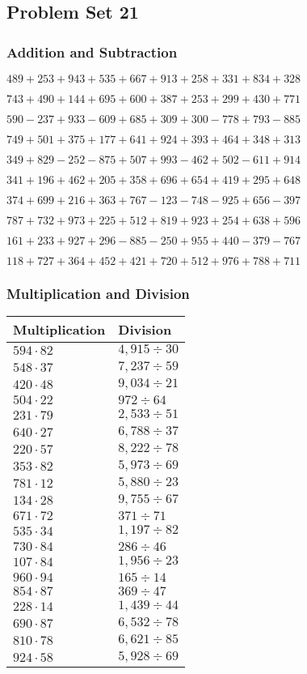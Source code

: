 \hypertarget{problem-set-21-2}{%
\subsection{Problem Set 21}\label{problem-set-21-2}}

\hypertarget{addition-and-subtraction-121}{%
\subsubsection{Addition and
Subtraction}\label{addition-and-subtraction-121}}

\(489 + 253 + 943 + 535 + 667 + 913 + 258 + 331 + 834 + 328\)

\(743 + 490 + 144 + 695 + 600 + 387 + 253 + 299 + 430 + 771\)

\(590 - 237 + 933 - 609 + 685 + 309 + 300 - 778 + 793 - 885\)

\(749 + 501 + 375 + 177 + 641 + 924 + 393 + 464 + 348 + 313\)

\(349 + 829 - 252 - 875 + 507 + 993 - 462 + 502 - 611 + 914\)

\(341 + 196 + 462 + 205 + 358 + 696 + 654 + 419 + 295 + 648\)

\(374 + 699 + 216 + 363 + 767 - 123 - 748 - 925 + 656 - 397\)

\(787 + 732 + 973 + 225 + 512 + 819 + 923 + 254 + 638 + 596\)

\(161 + 233 + 927 + 296 - 885 - 250 + 955 + 440 - 379 - 767\)

\(118 + 727 + 364 + 452 + 421 + 720 + 512 + 976 + 788 + 711\)

\hypertarget{multiplication-and-division-121}{%
\subsubsection{Multiplication and
Division}\label{multiplication-and-division-121}}

\begin{longtable}[]{@{}ll@{}}
\toprule
Multiplication & Division\tabularnewline
\midrule
\endhead
\(594 \cdot 82\) & \(4,915÷30\)\tabularnewline
\(548 \cdot 37\) & \(7,237÷59\)\tabularnewline
\(420 \cdot 48\) & \(9,034÷21\)\tabularnewline
\(504 \cdot 22\) & \(972÷64\)\tabularnewline
\(231 \cdot 79\) & \(2,533÷51\)\tabularnewline
\(640 \cdot 27\) & \(6,788÷37\)\tabularnewline
\(220 \cdot 57\) & \(8,222÷78\)\tabularnewline
\(353 \cdot 82\) & \(5,973÷69\)\tabularnewline
\(781 \cdot 12\) & \(5,880÷23\)\tabularnewline
\(134 \cdot 28\) & \(9,755÷67\)\tabularnewline
\(671 \cdot 72\) & \(371÷71\)\tabularnewline
\(535 \cdot 34\) & \(1,197÷82\)\tabularnewline
\(730 \cdot 84\) & \(286÷46\)\tabularnewline
\(107 \cdot 84\) & \(1,956÷23\)\tabularnewline
\(960 \cdot 94\) & \(165÷14\)\tabularnewline
\(854 \cdot 87\) & \(369÷47\)\tabularnewline
\(228 \cdot 14\) & \(1,439 ÷ 44\)\tabularnewline
\(690 \cdot 87\) & \(6,532÷78\)\tabularnewline
\(810 \cdot 78\) & \(6,621÷85\)\tabularnewline
\(924 \cdot 58\) & \(5,928÷69\)\tabularnewline
\bottomrule
\end{longtable}

